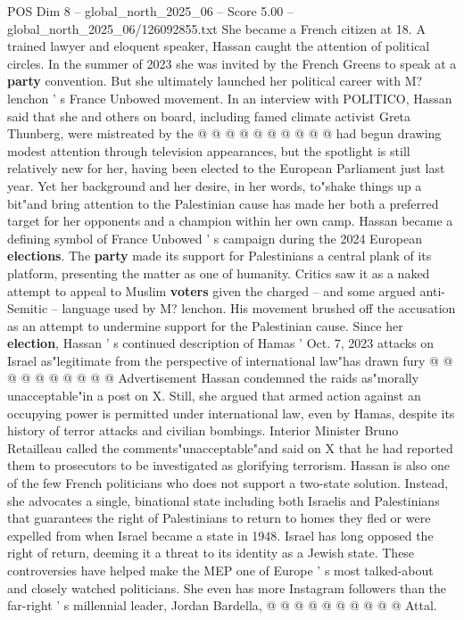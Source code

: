 \begin{textsample}{POS Dim 8 – global\_north\_2025\_06 – Score 5.00 – global\_north\_2025\_06/126092855.txt}
She became a French citizen at 18.
A trained lawyer and eloquent speaker, Hassan caught the attention of political circles.
In the summer of 2023 she was invited by the French Greens to speak at a \textbf{party} convention.
But she ultimately launched her political career with M? lenchon ' s France Unbowed movement.
In an interview with POLITICO, Hassan said that she and others on board, including famed climate activist Greta Thunberg, were mistreated by the @ @ @ @ @ @ @ @ @ @ had begun drawing modest attention through television appearances, but the spotlight is still relatively new for her, having been elected to the European Parliament just last year.
Yet her background and her desire, in her words, to"shake things up a bit"and bring attention to the Palestinian cause has made her both a preferred target for her opponents and a champion within her own camp.
Hassan became a defining symbol of France Unbowed ' s campaign during the 2024 European \textbf{elections}.
The \textbf{party} made its support for Palestinians a central plank of its platform, presenting the matter as one of humanity.
Critics saw it as a naked attempt to appeal to Muslim \textbf{voters} given the charged -- and some argued anti-Semitic -- language used by M? lenchon.
His movement brushed off the accusation as an attempt to undermine support for the Palestinian cause.
Since her \textbf{election}, Hassan ' s continued description of Hamas ' Oct. 7, 2023 attacks on Israel as"legitimate from the perspective of international law"has drawn fury @ @ @ @ @ @ @ @ @ @ Advertisement Hassan condemned the raids as"morally unacceptable"in a post on X.
Still, she argued that armed action against an occupying power is permitted under international law, even by Hamas, despite its history of terror attacks and civilian bombings.
Interior Minister Bruno Retailleau called the comments"unacceptable"and said on X that he had reported them to prosecutors to be investigated as glorifying terrorism.
Hassan is also one of the few French politicians who does not support a two-state solution.
Instead, she advocates a single, binational state including both Israelis and Palestinians that guarantees the right of Palestinians to return to homes they fled or were expelled from when Israel became a state in 1948.
Israel has long opposed the right of return, deeming it a threat to its identity as a Jewish state.
These controversies have helped make the MEP one of Europe ' s most talked-about and closely watched politicians.
She even has more Instagram followers than the far-right ' s millennial leader, Jordan Bardella, @ @ @ @ @ @ @ @ @ @ Attal.

\end{textsample}
